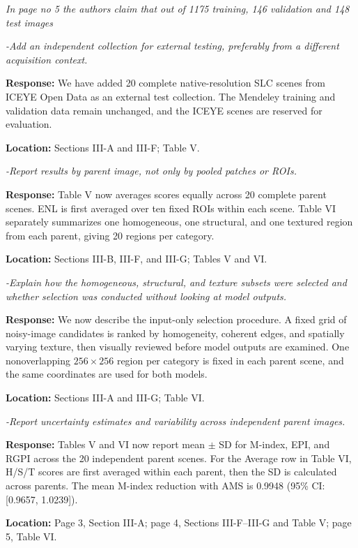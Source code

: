 \documentclass[11pt,letterpaper]{article}
\newcommand{\reviewgroup}[1]{%
  \Needspace{5\baselineskip}%
  \medskip\textit{#1}\par
}
\begin{document}
\reviewgroup{In page no 5 the authors claim that out of 1175 training, 146 validation and 148 test images}

\textit{-Add an independent collection for external testing, preferably from a different acquisition context.}

\textbf{Response:} We have added 20 complete native-resolution SLC scenes from ICEYE Open Data as an external test collection. The Mendeley training and validation data remain unchanged, and the ICEYE scenes are reserved for evaluation.

\textbf{Location:} Sections III-A and III-F; Table V.

\textit{-Report results by parent image, not only by pooled patches or ROIs.}

\textbf{Response:} Table V now averages scores equally across 20 complete parent scenes. ENL is first averaged over ten fixed ROIs within each scene. Table VI separately summarizes one homogeneous, one structural, and one textured region from each parent, giving 20 regions per category.

\textbf{Location:} Sections III-B, III-F, and III-G; Tables V and VI.

\textit{-Explain how the homogeneous, structural, and texture subsets were selected and whether selection was conducted without looking at model outputs.}

\textbf{Response:} We now describe the input-only selection procedure. A fixed grid of noisy-image candidates is ranked by homogeneity, coherent edges, and spatially varying texture, then visually reviewed before model outputs are examined. One nonoverlapping \(256\times256\) region per category is fixed in each parent scene, and the same coordinates are used for both models.

\textbf{Location:} Sections III-A and III-G; Table VI.

\textit{-Report uncertainty estimates and variability across independent parent images.}

\textbf{Response:} Tables V and VI now report mean $\pm$ SD for M-index, EPI, and RGPI across the 20 independent parent scenes. For the Average row in Table VI, H/S/T scores are first averaged within each parent, then the SD is calculated across parents. The mean M-index reduction with AMS is 0.9948 (95\% CI: [0.9657, 1.0239]).

\textbf{Location:} Page 3, Section III-A; page 4, Sections III-F--III-G and Table V; page 5, Table VI.
\end{document}
